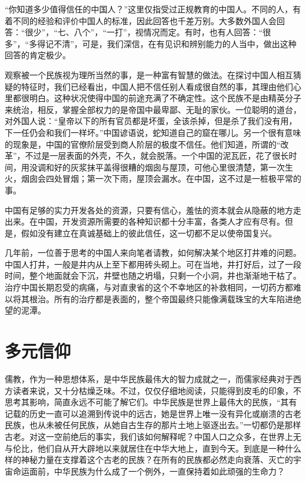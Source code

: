 \documentclass[12pt,oneside]{book}
\begin{document}
\begin{common-format}
“你知道多少值得信任的中国人？”这里仅指受过正规教育的中国人。不同的人，有着不同的经验和评价中国人的标准，因此回答也千差万别。大多数外国人会回答：“很少”，“七、八个”，“一打”，视情况而定。有时，也有人回答：“很多”，“多得记不清”，可是，我们深信，在有见识和辨别能力的人当中，做出这种回答的肯定极少。 

观察被一个民族视为理所当然的事，是一种富有智慧的做法。在探讨中国人相互猜疑的特征时，我们已经看出，中国人把不信任别人看成很自然的事，其理由他们心里都很明白。这种状况使得中国的前途充满了不确定性。这个民族不是由精英分子来统治，相反，掌握全部权力的是帝国中最卑鄙、无耻的家伙。一位聪明的道台，对外国人说：“皇帝以下的所有官员都是坏蛋，全该杀掉，但是杀了我们没有用，下一任仍会和我们一样坏。”中国谚语说，蛇知道自己的窟在哪儿。另一个很有意味的现象是，中国的官僚阶层受到商人阶层的极度不信任。他们知道，所谓的“改革”，不过是一层表面的外壳，不久，就会脱落。一个中国的泥瓦匠，花了很长时间，用没调和好的灰浆抹平盖得很糟的烟囱与屋顶，可他心里很清楚，第一次生火，烟囱会四处冒烟；第一次下雨，屋顶会漏水。在中国，这不过是一桩极平常的事。 

中国有足够的实力开发各处的资源，只要有信心，羞怯的资本就会从隐蔽的地方走出来。在中国，开发资源所需要的各种知识都十分丰富，各类人才应有尽有。但是，假如没有建立在真诚基础上的彼此信任，这一切都不足以使帝国复兴。 

几年前，一位善于思考的中国人来向笔者请教，如何解决某个地区打井难的问题。中国人打井，一般是井内从上至下都用砖头砌上。可在当地，井打好后，过了一段时间，整个地面就会下沉，井壁也随之坍塌，只剩一个小洞，井也渐渐地干枯了。治疗中国长期忍受的病痛，与对直隶省的这个不幸地区的补救相同，一切药方都难以将其根治。所有的治疗都是表面的，整个帝国最终只能像满载珠宝的大车陷进绝望的泥潭。 

\chapter{多元信仰}
儒教，作为一种思想体系，是中华民族最伟大的智力成就之一，而儒家经典对于西方读者来说，又十分枯燥乏味。不过，仅仅仔细地阅读，只能得到皮毛的印象，不思考其影响，简直永远不可能了解它们。中华民族是世界上最伟大的民族，“其有记载的历史一直可以追溯到传说中的远古，她是世界上唯一没有异化或崩溃的古老民族，也从未被任何民族，从她自古生存的那片土地上驱逐出去。”一切都仍是那样古老。对这一空前绝后的事实，我们该如何解释呢？中国人口之众多，在世界上无与伦比，他们自从开大辟地以来就居住在中华大地上，直到今天。到底是一种什么样的神秘力量在支撑着这个古老的民族？在所有的民族都必然走向衰落、灭亡的宇宙命运面前，中华民族为什么成了一个例外，一直保持着如此顽强的生命力？ 


\end{common-format}
\end{document}
